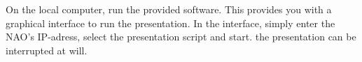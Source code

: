 
On the local computer, run the provided software. This provides you with a graphical interface to run the presentation. In the interface, simply enter the NAO's IP-adress, select the presentation script and start. the presentation can be interrupted at will.

